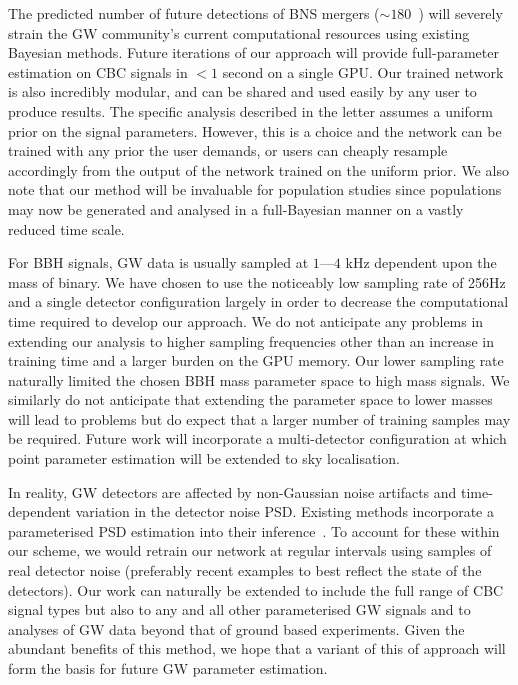 \documentclass[%
showpacs,
 amsmath,amssymb,
 aps,
 twocolumn,
 prl,
 reprint,
floatfix,
]{revtex4-1}
\begin{document}
%
%
The predicted number of future detections of \ac{BNS} mergers ($\sim
180$~\cite{1304.0670,1811.12907}) will severely strain the \ac{GW} community's
current computational resources using existing Bayesian methods. Future
iterations of our approach will provide full-parameter estimation on \ac{CBC}
signals in $<1$ second on a single \ac{GPU}. Our trained network is also
incredibly modular, and can be shared and used easily by any user to produce
results. The specific analysis described in the letter assumes a uniform prior
on the signal parameters. However, this is a choice and the network can be
trained with any prior the user demands, or users can cheaply resample
accordingly from the output of the network trained on the uniform prior. We
also note that our method will be invaluable for population studies since
populations may now be generated and analysed in a full-Bayesian manner on a
vastly reduced time scale. 

%
%
For \ac{BBH} signals, \ac{GW} data is usually sampled at $1$---$4$ kHz
dependent upon the mass of binary. We have chosen to use the noticeably low
sampling rate of 256Hz and a single detector configuration largely in order to
decrease the computational time required to develop our approach. We do not
anticipate any problems in extending our analysis to higher sampling
frequencies other than an increase in training time and a larger burden on the
\ac{GPU} memory. Our lower sampling rate naturally limited the chosen \ac{BBH}
mass parameter space to high mass signals. We similarly do not anticipate that
extending the parameter space to lower masses will lead to problems but do
expect that a larger number of training samples may be required. Future work
will incorporate a multi-detector configuration at which point parameter
estimation will be extended to sky localisation. 

%
%
In reality, \ac{GW} detectors are affected by non-Gaussian noise artifacts and
time-dependent variation in the detector noise \ac{PSD}. Existing methods
incorporate a parameterised \ac{PSD} estimation into their
inference~\cite{ref}. To account for these within our scheme, we would retrain
our network at regular intervals using samples of real detector noise
(preferably recent examples to best reflect the state of the detectors). Our
work can naturally be extended to include the full range of \ac{CBC} signal
types but also to any and all other parameterised \ac{GW} signals and to
analyses of \ac{GW} data beyond that of ground based experiments. Given the
abundant benefits of this method, we hope that a variant of this of approach
will form the basis for future \ac{GW} parameter estimation.
%
%
\end{document}
